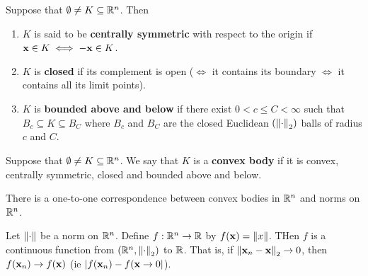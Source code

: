 \begin{definition}
    Suppose that \(\emptyset \neq K \subseteq \mathbb{R}^n\). Then
    \begin{enumerate}
        \item \(K\) is said to be \textbf{centrally symmetric} with respect to the origin if \({\bf x} \in K \iff {\bf -x} \in K\).
        \item \(K\) is \textbf{closed} if its complement is open (\(\iff\) it contains its boundary \(\iff\) it contains all its limit points).
        \item \(K\) is \textbf{bounded above and below} if there exist \(0 < c \leq C < \infty\) such that \(B_c \subseteq K \subseteq B_C\) where \(B_c\) and \(B_C\) are the closed Euclidean \((\norm{\cdot}_2)\) balls of radius \(c\) and \(C\).
    \end{enumerate}
\end{definition}

\begin{definition}
    Suppose that \(\emptyset \neq K \subseteq \mathbb{R}^n\). We say that \(K\) is a \textbf{convex body} if it is convex, centrally symmetric, closed and bounded above and below.
\end{definition}

\begin{theorem}
    There is a one-to-one correspondence between convex bodies in \(\mathbb{R}^n\) and norms on \(\mathbb{R}^n\).
\end{theorem}

\begin{lemma}
    Let \(\norm{\cdot}\) be a norm on \(\mathbb{R}^n\). Define \(f: \mathbb{R}^n \to \mathbb{R}\) by \(f({\bf x}) = \norm{x}\). THen \(f\) is a continuous function from \((\mathbb{R}^n, \norm{\cdot}_2)\) to \(\mathbb{R}\). That is, if \(\norm{{\bf x}_n - {\bf x}}_2 \to 0\), then \(f({\bf x}_n) \to f({\bf x})\) (ie \(|f({\bf x}_n) - f({\bf x} \to 0|\)).
\end{lemma}

\pagebreak
